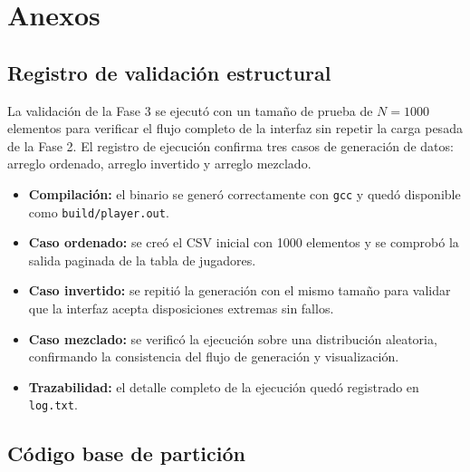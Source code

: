\section{Anexos}\label{sec:anexos}

\subsection{Registro de validación estructural}
La validación de la Fase 3 se ejecutó con un tamaño de prueba de $N=1000$ elementos para verificar el flujo completo de la interfaz sin repetir la carga pesada de la Fase 2. El registro de ejecución confirma tres casos de generación de datos: arreglo ordenado, arreglo invertido y arreglo mezclado.

\begin{itemize}
    \item \textbf{Compilación:} el binario se generó correctamente con \texttt{gcc} y quedó disponible como \texttt{build/player.out}.
    \item \textbf{Caso ordenado:} se creó el CSV inicial con 1000 elementos y se comprobó la salida paginada de la tabla de jugadores.
    \item \textbf{Caso invertido:} se repitió la generación con el mismo tamaño para validar que la interfaz acepta disposiciones extremas sin fallos.
    \item \textbf{Caso mezclado:} se verificó la ejecución sobre una distribución aleatoria, confirmando la consistencia del flujo de generación y visualización.
    \item \textbf{Trazabilidad:} el detalle completo de la ejecución quedó registrado en \texttt{log.txt}.
\end{itemize}

\subsection{Código base de partición}

